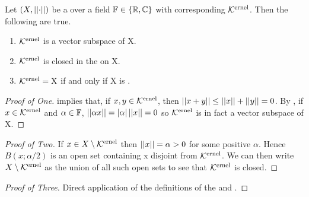 \begin{prop}
\label{prop:seminormkernelisavectorsubspace}
    Let $(X,\left|\left| \cdot \right|\right|)$ be a \SeminormedSpace over a field $\mathbb{F} \in \{\mathbb{R}, \mathbb{C}\}$  
    with corresponding \SeminormKernel $\bf\mathcal{K}\rm^{ernel}$. 
    Then the following are true. 
    \begin{enumerate}
        \item $\bf\mathcal{K}\rm^{ernel}$ is a vector subspace of X. 
        \item $\bf\mathcal{K}\rm^{ernel}$ is closed in the \SeminormTopology on X.
        \item $\bf\mathcal{K}\rm^{ernel}=X$ if and only if X is \Degenerate. 
    \end{enumerate}


    \begin{proof}[Proof of One]
        \Subadditivity implies that, if $x,y \in \bf\mathcal{K}\rm^{ernel}$, then $\left|\left| x+y \right|\right| \leq \left|\left| x \right|\right|+\left|\left| y \right|\right|=0$. 
        By \ScalarHomogeneity, if $x \in \bf\mathcal{K}\rm^{ernel}$  and $\alpha \in \mathbb{F}$, $\left|\left| \alpha x \right|\right| =|\alpha| \left|\left| x \right|\right|=0$
        so $\bf\mathcal{K}\rm^{ernel}$ is in fact a vector subspace of X. 
    \end{proof}
    \begin{proof}[Proof of Two]
        
        If $x \in X \setminus  \bf\mathcal{K}\rm^{ernel}$
        then $\left|\left| x \right|\right| = \alpha > 0$ for some positive $\alpha$. 
        Hence $B(x;\alpha/2)$ is an open set containing x disjoint from $\bf\mathcal{K}\rm^{ernel}$. 
       We can then write $X \setminus \bf\mathcal{K}\rm^{ernel}$ as the union of all such open sets to see that $\bf\mathcal{K}\rm^{ernel}$ is closed. 
    \end{proof}
	
	\begin{proof}[Proof of Three]
		Direct application of the definitions of the \SeminormKernel
		and \Degenerate \Seminorm. 
	\end{proof} 
\end{prop}

